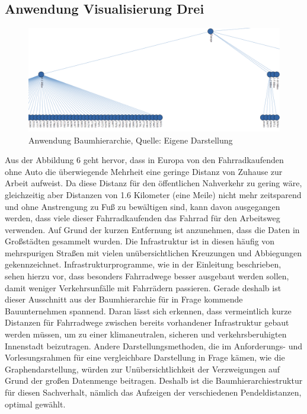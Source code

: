 \documentclass[usegeometry=true]{scrartcl}
\begin{document}
\subsection{Anwendung Visualisierung Drei}
\begin{figure}[h]
\begin{center}
\includegraphics[width=16cm]{Bilder/BaumhierarchieA3.png}
\caption{Anwendung Baumhierarchie, Quelle: Eigene Darstellung}
\end{center}
\end{figure}
Aus der Abbildung 6 geht hervor, dass in Europa von den Fahrradkaufenden ohne Auto die überwiegende Mehrheit eine geringe Distanz von Zuhause zur Arbeit aufweist. Da diese Distanz für den öffentlichen Nahverkehr zu gering wäre, gleichzeitig aber Distanzen von 1.6 Kilometer (eine Meile) nicht mehr zeitsparend und ohne Anstrengung zu Fuß zu bewältigen sind, kann davon ausgegangen werden, dass viele dieser Fahrradkaufenden das Fahrrad für den Arbeitsweg verwenden. Auf Grund der kurzen Entfernung ist anzunehmen, dass die Daten in Großstädten gesammelt wurden. Die Infrastruktur ist in diesen häufig von mehrspurigen Straßen mit vielen unübersichtlichen Kreuzungen und Abbiegungen gekennzeichnet. Infrastrukturprogramme, wie in der Einleitung beschrieben, sehen hierzu vor, dass besonders Fahrradwege besser ausgebaut werden sollen, damit weniger Verkehrsunfälle mit Fahrrädern passieren. Gerade deshalb ist dieser Ausschnitt aus der Baumhierarchie für in Frage kommende Bauunternehmen spannend. Daran lässt sich erkennen, dass vermeintlich kurze Distanzen für Fahrradwege zwischen bereits vorhandener Infrastruktur gebaut werden müssen, um zu einer klimaneutralen, sicheren und verkehrsberuhigten Innenstadt beizutragen. 
Andere Darstellungsmethoden, die im Anforderungs- und Vorlesungsrahmen für eine vergleichbare Darstellung in Frage kämen, wie die Graphendarstellung, würden zur Unübersichtlichkeit der Verzweigungen auf Grund der großen Datenmenge beitragen. Deshalb ist die Baumhierarchiestruktur für diesen Sachverhalt, nämlich das Aufzeigen der verschiedenen Pendeldistanzen, optimal gewählt. 
\newpage
\end{document}
